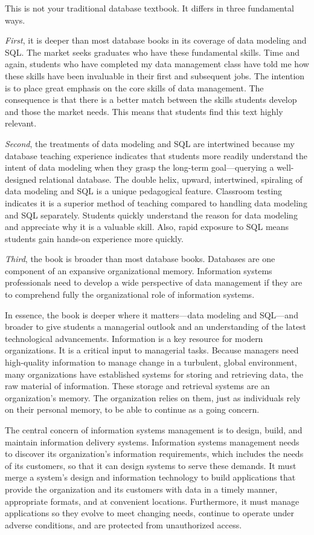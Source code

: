 \documentclass[
]{article}
\begin{document}
This is not your traditional database textbook. It differs in three
fundamental ways.

\emph{First}, it is deeper than most database books in its coverage of data
modeling and SQL. The market seeks graduates who have these fundamental
skills. Time and again, students who have completed my data management
class have told me how these skills have been invaluable in their first
and subsequent jobs. The intention is to place great emphasis on the
core skills of data management. The consequence is that there is a
better match between the skills students develop and those the market
needs. This means that students find this text highly relevant.

\emph{Second}, the treatments of data modeling and SQL are intertwined
because my database teaching experience indicates that students more
readily understand the intent of data modeling when they grasp the
long-term goal---querying a well-designed relational database. The
double helix, upward, intertwined, spiraling of data modeling and SQL is
a unique pedagogical feature. Classroom testing indicates it is a
superior method of teaching compared to handling data modeling and SQL
separately. Students quickly understand the reason for data modeling and
appreciate why it is a valuable skill. Also, rapid exposure to SQL means
students gain hands-on experience more quickly.

\emph{Third}, the book is broader than most database books. Databases are one
component of an expansive organizational memory. Information systems
professionals need to develop a wide perspective of data management if
they are to comprehend fully the organizational role of information
systems.

In essence, the book is deeper where it matters---data modeling and
SQL---and broader to give students a managerial outlook and an
understanding of the latest technological advancements. Information is a
key resource for modern organizations. It is a critical input to
managerial tasks. Because managers need high-quality information to
manage change in a turbulent, global environment, many organizations
have established systems for storing and retrieving data, the raw
material of information. These storage and retrieval systems are an
organization's memory. The organization relies on them, just as
individuals rely on their personal memory, to be able to continue as a
going concern.

The central concern of information systems management is to design,
build, and maintain information delivery systems. Information systems
management needs to discover its organization's information
requirements, which includes the needs of its customers, so that it can
design systems to serve these demands. It must merge a system's design
and information technology to build applications that provide the
organization and its customers with data in a timely manner, appropriate
formats, and at convenient locations. Furthermore, it must manage
applications so they evolve to meet changing needs, continue to operate
under adverse conditions, and are protected from unauthorized access.
\end{document}
